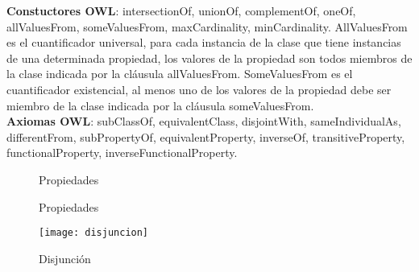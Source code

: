 \documentclass[12pt]{article}
\begin{document}
\textbf{Constuctores OWL}: intersectionOf, unionOf, complementOf, oneOf, allValuesFrom, someValuesFrom, maxCardinality, minCardinality. AllValuesFrom es el cuantificador universal, para cada instancia de la clase que tiene instancias de una determinada propiedad, los valores de la propiedad son todos miembros de la clase indicada por la cláusula allValuesFrom. SomeValuesFrom es el cuantificador existencial, al menos uno de los valores de la propiedad debe ser miembro de la clase indicada por la cláusula someValuesFrom.\\

\textbf{Axiomas OWL}: subClassOf, equivalentClass, disjointWith, sameIndividualAs, differentFrom, subPropertyOf, equivalentProperty, inverseOf, transitiveProperty, functionalProperty, inverseFunctionalProperty.

\begin{figure}[H]
 \centering
 \caption{Propiedades}
 \label{f:prop11}
\end{figure}

\begin{figure}[H]
 \centering
 \caption{Propiedades}
 \label{f:prop12}
\end{figure}

\begin{figure}[H]
\centering
\texttt{[image: disjuncion]}
\caption{Disjunción}
\label{fig:disjuncion}
\end{figure}
\end{document}
